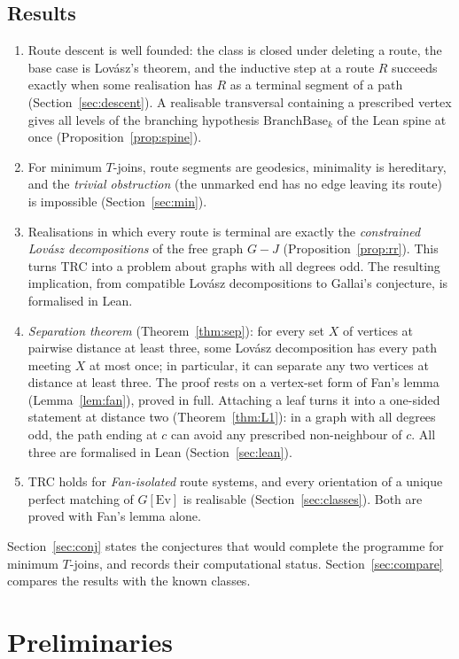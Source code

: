 \documentclass[11pt]{amsart}
\theoremstyle{definition}
\newcommand{\Ev}{\mathrm{Ev}}
\begin{document}
\subsection*{Results}
\begin{enumerate}
\item Route descent is well founded: the class is closed under deleting a route, the base case is
Lov\'asz's theorem, and the inductive step at a route $R$ succeeds exactly when some realisation has $R$
as a terminal segment of a path (Section~\ref{sec:descent}). A realisable transversal containing a
prescribed vertex gives all levels of the branching hypothesis $\mathrm{BranchBase}_k$ of the Lean spine
at once (Proposition~\ref{prop:spine}).
\item For minimum $T$-joins, route segments are geodesics, minimality is hereditary, and the
\emph{trivial obstruction} (the unmarked end has no edge leaving its route) is impossible
(Section~\ref{sec:min}).
\item Realisations in which every route is terminal are exactly the \emph{constrained Lov\'asz
decompositions} of the free graph $G-J$ (Proposition~\ref{prop:rr}). This turns TRC into a problem about
graphs with all degrees odd. The resulting implication, from compatible Lov\'asz decompositions to
Gallai's conjecture, is formalised in Lean.
\item \emph{Separation theorem} (Theorem~\ref{thm:sep}): for every set $X$ of vertices at pairwise
distance at least three, some Lov\'asz decomposition has every path meeting $X$ at most once; in
particular, it can separate any two vertices at distance at least three. The proof rests on a vertex-set form of Fan's lemma
(Lemma~\ref{lem:fan}), proved in full. Attaching a leaf turns it into a one-sided statement at
distance two (Theorem~\ref{thm:L1}): in a graph with all degrees odd, the path ending at $c$ can avoid
any prescribed non-neighbour of $c$. All three are formalised in Lean (Section~\ref{sec:lean}).
\item TRC holds for \emph{Fan-isolated} route systems, and every orientation of a unique perfect matching
of $G[\Ev]$ is realisable (Section~\ref{sec:classes}). Both are proved with Fan's lemma alone.
\end{enumerate}
Section~\ref{sec:conj} states the conjectures that would complete the programme for minimum $T$-joins,
and records their computational status. Section~\ref{sec:compare} compares the results with the known
classes.

\section{Preliminaries}\label{sec:prelim}
\end{document}
